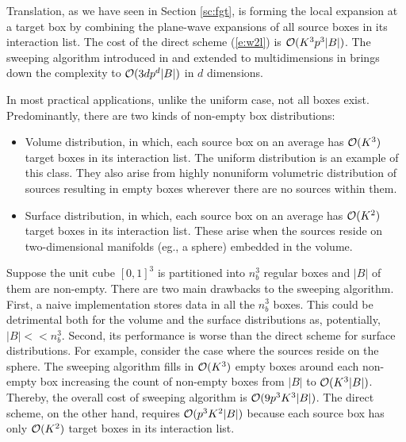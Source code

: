 Translation, as we have seen in Section \ref{sc:fgt}, is forming the local expansion at a target box by combining the plane-wave expansions of all source boxes in its interaction list.  The cost of the direct scheme (\ref{e:w2l}) is $\mathcal{O}(K^3 p^3 |B|)$. The sweeping algorithm introduced in \cite{greengard98} and extended to multidimensions in \cite{fggt} brings down the complexity to $\mathcal{O}(3dp^d |B|)$ in $d$ dimensions. 


In most practical applications, unlike the uniform case, not all boxes exist. Predominantly, there are two kinds of non-empty box distributions:
%
\begin{itemize}
 \item Volume distribution, in which, each source box on an average has $\mathcal{O}(K^3)$ target boxes in its interaction list. The uniform distribution is an example of this class. They also arise from highly nonuniform volumetric distribution of sources resulting in empty boxes wherever there are no sources within them. 
 
 \item Surface distribution, in which, each source box on an average has $\mathcal{O}(K^2)$ target boxes in its interaction list. These arise when the sources reside on two-dimensional manifolds (eg., a sphere) embedded in the volume. 
\end{itemize}
%   
% 

%

Suppose the unit cube $[0, 1]^3$ is partitioned into $n_b^3$ regular boxes and $|B|$ of them are non-empty. There are two main drawbacks to the sweeping algorithm. First, a naive implementation stores data in all the $n_b^3$ boxes. This could be detrimental both for the volume and the surface distributions as, potentially, $|B| <\!< n_b^3$. Second, its performance is worse than the direct scheme for surface distributions. For example, consider the case where the sources reside on the sphere. The sweeping algorithm fills in $\mathcal{O}(K^3)$ empty boxes around each non-empty box increasing the count of non-empty boxes from $|B|$ to $\mathcal{O}(K^3 |B|)$. Thereby, the overall cost of sweeping algorithm is $\mathcal{O}(9 p^3 K^3 |B|)$. The direct scheme, on the other hand, requires $\mathcal{O}(p^3 K^2 |B|)$ because each source box has only $\mathcal{O}(K^2)$ target boxes in its interaction list. 

